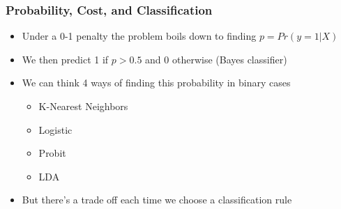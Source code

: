 \documentclass[
  shownotes,
  xcolor={svgnames},
  hyperref={colorlinks,citecolor=DarkBlue,linkcolor=DarkRed,urlcolor=DarkBlue}
  , aspectratio=169]{beamer}
\begin{document}
\begin{frame}[fragile]
\frametitle{Probability, Cost, and Classification}

\begin{itemize}
  \item Under a 0-1 penalty the problem boils down to finding $p=Pr(y=1|X)$
  \medskip
  \item We then predict 1 if $p>0.5$ and 0 otherwise (Bayes classifier)
  \medskip
  \item We can think 4 ways of finding this probability in binary cases
  \begin{itemize}
    \item K-Nearest Neighbors
    \item Logistic
    \item Probit
    \item LDA
  \end{itemize}
\medskip
  \item But there's a trade off each time we choose a classification rule
\end{itemize}


\end{frame}
\end{document}

